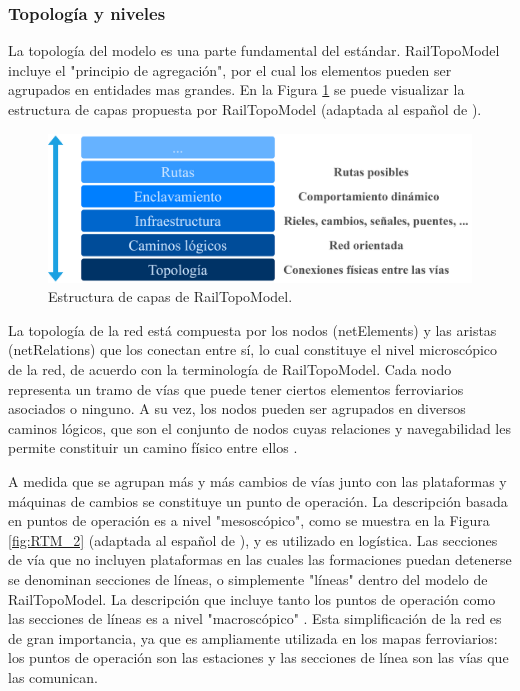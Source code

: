 \subsubsection{Topología y niveles}

    La topología del modelo es una parte fundamental del estándar. RailTopoModel incluye el "principio de agregación", por el cual los elementos pueden ser agrupados en entidades mas grandes. En la Figura \ref{fig:RTM_1} se puede visualizar la estructura de capas propuesta por RailTopoModel (adaptada al español de \cite{Paper_109}).

    \begin{figure}[H]
        \centering
        \includegraphics[width=1\textwidth]{Figuras/capas}
        \centering\caption{Estructura de capas de RailTopoModel.}
        \label{fig:RTM_1}
    \end{figure}
    
    La topología de la red está compuesta por los nodos (netElements) y las aristas (netRelations) que los conectan entre sí, lo cual constituye el nivel microscópico de la red, de acuerdo con la terminología de RailTopoModel. Cada nodo representa un tramo de vías que puede tener ciertos elementos ferroviarios asociados o ninguno. A su vez, los nodos pueden ser agrupados en diversos caminos lógicos, que son el conjunto de nodos cuyas relaciones y navegabilidad les permite constituir un camino físico entre ellos \cite{Paper_150}.

    A medida que se agrupan más y más cambios de vías junto con las plataformas y máquinas de cambios se constituye un punto de operación. La descripción basada en puntos de operación es a nivel "mesoscópico", como se muestra en la Figura \ref{fig:RTM_2} (adaptada al español de \cite{Paper_109}), y es utilizado en logística. Las secciones de vía que no incluyen plataformas en las cuales las formaciones puedan detenerse se denominan secciones de líneas, o simplemente "líneas" dentro del modelo de RailTopoModel. La descripción que incluye tanto los puntos de operación como las secciones de líneas es a nivel "macroscópico" \cite{Paper_149}. Esta simplificación de la red es de gran importancia, ya que es ampliamente utilizada en los mapas ferroviarios: los puntos de operación son las estaciones y las secciones de línea son las vías que las comunican. 
    
